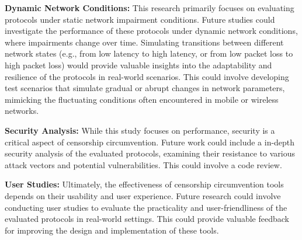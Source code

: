 \noindent\textbf{Dynamic Network Conditions:}
This research primarily focuses on evaluating protocols under static network impairment conditions.
Future studies could investigate the performance of these protocols under dynamic network conditions, where impairments change over time.
Simulating transitions between different network states (e.g., from low latency to high latency, or from low packet loss to high packet loss) would provide valuable insights into the adaptability and resilience of the protocols in real-world scenarios.
This could involve developing test scenarios that simulate gradual or abrupt changes in network parameters, mimicking the fluctuating conditions often encountered in mobile or wireless networks.

\noindent\textbf{Security Analysis:}
While this study focuses on performance, security is a critical aspect of censorship circumvention.
Future work could include a  in-depth security analysis of the evaluated protocols, examining their resistance to various attack vectors and potential vulnerabilities.
This could involve a code review.

\noindent\textbf{User Studies:}
Ultimately, the effectiveness of censorship circumvention tools depends on their usability and user experience.
Future research could involve conducting user studies to evaluate the practicality and user-friendliness of the evaluated protocols in real-world settings.
This could provide valuable feedback for improving the design and implementation of these tools.


